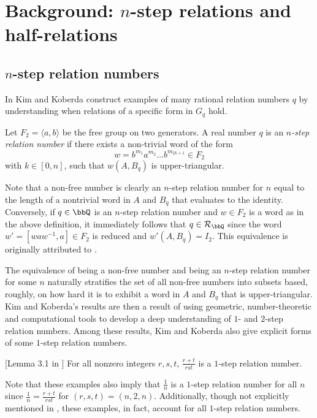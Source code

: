 \documentclass[11 pt]{amsart}
\begin{document}
\section{Background: \texorpdfstring{$n$}{n}-step relations and half-relations} 
\label{sec:def}

\subsection{\texorpdfstring{$n$}{n}-step relation numbers}
\label{sec:step}
In \cite{kimkoberda} Kim and Koberda construct examples of many rational relation numbers $q$ by understanding when relations of a specific form in $G_q$ hold.

\begin{definition}
    Let $F_2=\langle a,b\rangle$ be the free group on two generators. A real number $q$ is an \textit{$n$-step relation number} if there exists a non-trivial word of the form
    \[
    w=b^{m_1}a^{m_2}\ldots b^{m_{2k+1}}\in F_2
    \]
    with $k\in[0,n]$, such that $w(A,B_q)$ is upper-triangular.
\end{definition}

Note that a non-free number is clearly an $n$-step relation number for $n$ equal to the length of a nontrivial word in $A$ and $B_q$ that evaluates to the identity. Conversely, if $q\in\bbQ$ is an $n$-step relation number and $w\in F_2$ is a word as in the above definition, it immediately follows that $q\in\mathcal{R}_\bbQ$ since the word $w' = [waw^{-1},a]\in F_2$ is reduced and $w'(A,B_q)=I_2$. This equivalence is originally attributed to \cite{Lyndon_Ullman_1969}.

The equivalence of being a non-free number and being an $n$-step relation number for some $n$ naturally stratifies the set of all non-free numbers into subsets based, roughly, on how hard it is to exhibit a word in $A$ and $B_q$ that is upper-triangular. Kim and Koberda's results are then a result of using geometric, number-theoretic and computational tools to develop a deep understanding of $1$- and $2$-step relation numbers.
Among these results, Kim and Koberda also give explicit forms of some $1$-step relation numbers.

\begin{lemma}\label{lemma:onestep}[Lemma 3.1 in \cite{kimkoberda}]
    For all nonzero integers $r,s, t$, $\frac{r+t}{rst}$ is a $1$-step relation number.
\end{lemma}

Note that these examples also imply that $\frac{1}{n}$ is a $1$-step relation number for all $n$ since $\frac{1}{n}=\frac{r+t}{rst}$ for $(r,s,t)=(n,2,n)$. Additionally, though not explicitly mentioned in \cite{kimkoberda}, these examples, in fact, account for all $1$-step relation numbers.
\end{document}
